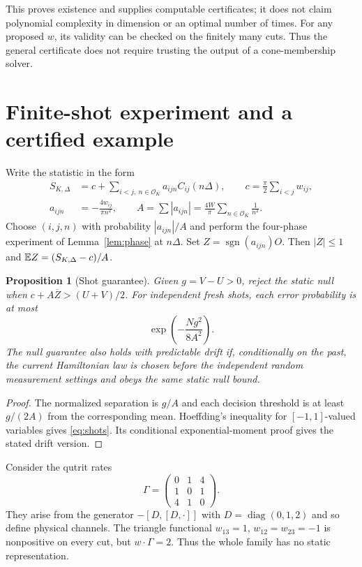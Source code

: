 \documentclass[11pt,a4paper]{article}
\newtheorem{proposition}[theorem]{Proposition}
\theoremstyle{remark}\newtheorem{remark}[theorem]{Remark}
\newcommand{\diag}{\operatorname{diag}}
\begin{document}
This proves existence and supplies computable certificates; it does not
claim polynomial complexity in dimension or an optimal number of times.
For any proposed $w$, its validity can be checked on the finitely many
cuts. Thus the general certificate does not require trusting the output
of a cone-membership solver.

\section{Finite-shot experiment and a certified example}\label{sec:shots}
Write the statistic in the form
\begin{equation}\label{eq:amplitude}
\begin{aligned}
 S_{K,\Delta}&=c+\sum_{i<j,\ n\in\mathcal O_K}a_{ijn}C_{ij}(n\Delta),
 \qquad c=\frac\pi2\sum_{i<j}w_{ij},\\
 a_{ijn}&=-\frac{4w_{ij}}{\pi n^2},\qquad
 A=\sum|a_{ijn}|=\frac{4W}{\pi}\sum_{n\in\mathcal O_K}\frac1{n^2}.
\end{aligned}
\end{equation}
Choose $(i,j,n)$ with probability $|a_{ijn}|/A$ and perform the
four-phase experiment of Lemma~\ref{lem:phase} at $n\Delta$.
Set $Z=\operatorname{sgn}(a_{ijn})O$. Then $|Z|\leq1$ and
$\mathbb E Z=(S_{K,\Delta}-c)/A$.

\begin{proposition}[Shot guarantee]\label{prop:shots}
Given $g=V-U>0$, reject the static null when
$c+A\overline Z>(U+V)/2$. For independent fresh shots, each error
probability is at most
\begin{equation}\label{eq:shots}
 \exp\!\left(-\frac{Ng^2}{8A^2}\right).
\end{equation}
The null guarantee also holds with predictable drift if, conditionally
on the past, the current Hamiltonian law is chosen before the independent
random measurement settings and obeys the same static null bound.
\end{proposition}
\begin{proof}
The normalized separation is $g/A$ and each decision threshold is at
least $g/(2A)$ from the corresponding mean. Hoeffding's inequality \cite{hoeffding} for
$[-1,1]$-valued variables gives \eqref{eq:shots}. Its conditional
exponential-moment proof gives the stated drift version.
\end{proof}

Consider the qutrit rates
\begin{equation}\label{eq:qutrit}
 \Gamma=\begin{pmatrix}0&1&4\\1&0&1\\4&1&0\end{pmatrix}.
\end{equation}
They arise from the generator $-[D,[D,\cdot]]$ with
$D=\diag(0,1,2)$ and so define physical channels. The triangle
functional $w_{13}=1$, $w_{12}=w_{23}=-1$ is nonpositive on every cut,
but $w\cdot\Gamma=2$. Thus the whole family has no static representation.
\end{document}
